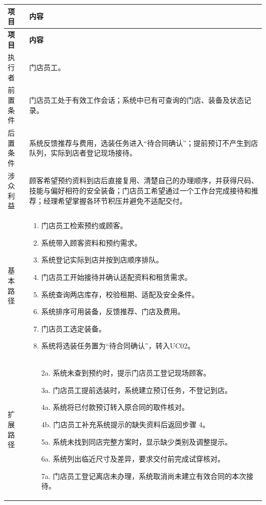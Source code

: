 \documentclass[11pt,a4paper]{article}
\renewcommand{\arraystretch}{1.28}
\newcommand{\toprule}{\hline}
\newcommand{\midrule}{\hline}
\begin{document}
{\small\renewcommand{\arraystretch}{1.13}\setlength{\parskip}{0pt}
\begin{longtable}{L{2.2cm}L{13.1cm}}
\toprule
\bfseries 项目 & \bfseries 内容\\
\midrule\endfirsthead
\toprule\bfseries 项目 & \bfseries 内容\\
\midrule\endhead
执行者 & 门店员工。\\
前置条件 & 门店员工处于有效工作会话；系统中已有可查询的门店、装备及状态记录。\\
后置条件 & 系统反馈推荐与费用，选装任务进入“待合同确认”；提前预订不产生到店队列，实际到店者登记现场接待。\\
涉众利益 & 顾客希望预约资料到店后直接复用、清楚自己的办理顺序，并获得尺码、技能与偏好相符的安全装备；门店员工希望通过一个工作台完成接待和推荐；经理希望掌握各环节积压并避免不适配交付。\\
基本路径 & \begin{enumerate}
\item 门店员工检索预约或顾客。
\item 系统带入顾客资料和预约需求。
\item 系统登记实际到店并按到店顺序排队。
\item 门店员工开始接待并确认适配资料和租赁需求。
\item 系统查询两店库存，校验租期、适配及安全条件。
\item 系统排序可用装备，反馈推荐、门店及费用。
\item 门店员工选定装备。
\item 系统将选装任务置为“待合同确认”，转入UC02。
\end{enumerate}\\
扩展路径 & \begin{itemize}
\item[2a.] 系统未查到预约时，提示门店员工登记现场顾客。
\item[3a.] 门店员工提前选装时，系统建立预订任务，不登记到店。
\item[4a.] 系统将已付款预订转入原合同的取件核对。
\item[4b.] 门店员工补充系统提示的缺失资料后返回步骤 4。
\item[5a.] 系统未找到同店完整方案时，显示缺少类别及调整提示。
\item[6a.] 系统列出临近尺寸及差异，要求交付前完成试穿核对。
\item[7a.] 门店员工登记离店未办理，系统取消尚未建立有效合同的本次接待。
\end{itemize}\\

\end{longtable}}
\end{document}

